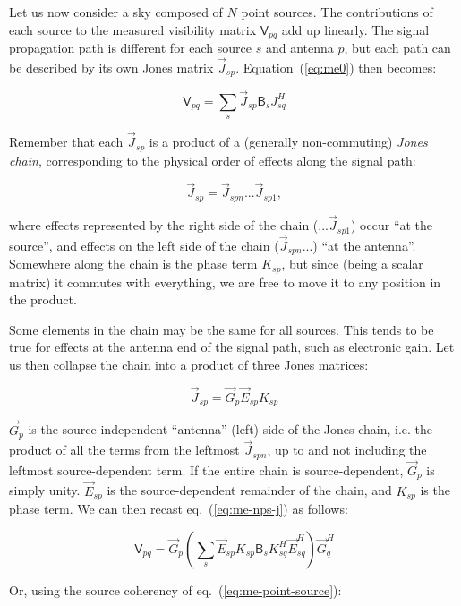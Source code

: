 \documentclass[]{aa}
\newcommand{\herm}{H}
\newcommand{\jones}[2]{\vec {#1}_{#2}}
\newcommand{\jonesT}[2]{\vec {#1}^{\herm}_{#2}}
\newcommand{\coh}[2]{\mathsf{{#1}}_{{#2}}}
\begin{document}
Let us now consider a sky composed of $N$ point sources. The contributions of each source to the measured visibility matrix $\coh{V}{pq}$ add up linearly. The signal propagation path is different for each source $s$ and antenna $p$, but each path can be described by its own Jones matrix $\jones{J}{sp}$. Equation~(\ref{eq:me0}) then becomes:

  \begin{equation}\label{eq:me-nps-j}
  \coh{V}{pq} = \sum_{s}{\jones{J}{sp} \coh{B}{s} J^\herm_{sq}}
  \end{equation}

Remember that each $\jones{J}{sp}$ is a product of a (generally non-commuting) {\em Jones chain}, corresponding to the physical order of effects along the signal path:

  \[
  \jones{J}{sp} = \jones{J}{spn} ... \jones{J}{sp1},
  \]

where effects represented by the right side of the chain ($...\jones{J}{sp1}$) occur ``at the source'', and effects on the left side of the chain ($\jones{J}{spn}...$) ``at the antenna''. Somewhere along the chain is the phase term $K_{sp}$, but since (being a scalar matrix) it commutes with everything, we are free to move it to any position in the product.

Some elements in the chain may be the same for all sources. This tends to be true for effects at the antenna end of the signal path, such as electronic gain. Let us then collapse the chain into a product of three Jones matrices:

  \[
  \jones{J}{sp} = \jones{G}{p} \jones{E}{sp} K_{sp}
  \]

$\jones{G}{p}$ is the source-independent ``antenna'' (left) side of the Jones chain, i.e. the product of all the terms from the leftmost $\jones{J}{spn}$, up to and not including the leftmost source-dependent term. If the entire chain is source-dependent, $\jones{G}{p}$ is simply unity. $\jones{E}{sp}$ is the source-dependent remainder of the chain, and $K_{sp}$ is the phase term. We can then recast eq.~(\ref{eq:me-nps-j}) as follows:

  \begin{equation}\label{eq:me-nps-gek}
  \coh{V}{pq} = \jones{G}{p} \left ( \sum_{s}{\jones{E}{sp} K_{sp} \coh{B}{s} K^\herm_{sq} \jonesT{E}{sq}} \right ) \jonesT{G}{q}
  \end{equation}

Or, using the source coherency of eq.~(\ref{eq:me-point-source}):
\end{document}

